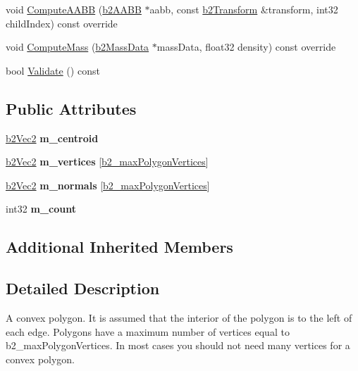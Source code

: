 \begin{DoxyCompactItemize}
void \mbox{\hyperlink{classb2PolygonShape_ae9bcc185caf4a030003cefc4576e4717}{Compute\+A\+A\+BB}} (\mbox{\hyperlink{structb2AABB}{b2\+A\+A\+BB}} $\ast$aabb, const \mbox{\hyperlink{structb2Transform}{b2\+Transform}} \&transform, int32 child\+Index) const override
\item 
void \mbox{\hyperlink{classb2PolygonShape_a908db2a51fc79fd49d6fe06be2cd8474}{Compute\+Mass}} (\mbox{\hyperlink{structb2MassData}{b2\+Mass\+Data}} $\ast$mass\+Data, float32 density) const override
\item 
bool \mbox{\hyperlink{classb2PolygonShape_a135f4c20e17f10479e08f7befbd4d1f0}{Validate}} () const
\end{DoxyCompactItemize}
\subsection*{Public Attributes}
\begin{DoxyCompactItemize}
\item 
\mbox{\label{classb2PolygonShape_ae8f5bd2f13f1e9b741c33350ba19cd9f}} 
\mbox{\hyperlink{structb2Vec2}{b2\+Vec2}} {\bfseries m\+\_\+centroid}
\item 
\mbox{\label{classb2PolygonShape_a11ee5c107660be5da25f0e164aaccd53}} 
\mbox{\hyperlink{structb2Vec2}{b2\+Vec2}} {\bfseries m\+\_\+vertices} \mbox{[}\mbox{\hyperlink{b2Settings_8h_a09d71ee1993bee28b5b2e6d893b41884}{b2\+\_\+max\+Polygon\+Vertices}}\mbox{]}
\item 
\mbox{\label{classb2PolygonShape_a97cdcec277321c62ecdf93cb649958ce}} 
\mbox{\hyperlink{structb2Vec2}{b2\+Vec2}} {\bfseries m\+\_\+normals} \mbox{[}\mbox{\hyperlink{b2Settings_8h_a09d71ee1993bee28b5b2e6d893b41884}{b2\+\_\+max\+Polygon\+Vertices}}\mbox{]}
\item 
\mbox{\label{classb2PolygonShape_a2c8cfdc15267f282e66f7bda7369b79f}} 
int32 {\bfseries m\+\_\+count}
\end{DoxyCompactItemize}
\subsection*{Additional Inherited Members}


\subsection{Detailed Description}
A convex polygon. It is assumed that the interior of the polygon is to the left of each edge. Polygons have a maximum number of vertices equal to b2\+\_\+max\+Polygon\+Vertices. In most cases you should not need many vertices for a convex polygon. 

